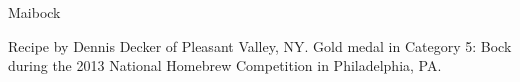 \begin{recipe}{Maibock}

\begin{aboutblock}
Recipe by Dennis Decker of Pleasant Valley, NY. Gold medal in Category 5: Bock
during the 2013 National Homebrew Competition in Philadelphia, PA.
\sourceaha
\end{aboutblock}


\begin{methodandtiming}

\begin{mashsteps}
\end{mashsteps}

\begin{fermentationsteps}
\end{fermentationsteps}

\end{methodandtiming}

\recipebreak

\begin{ingredientsblock}

\begin{malts}
\end{malts}

\begin{hops}
\end{hops}


\end{ingredientsblock}

\end{recipe}

